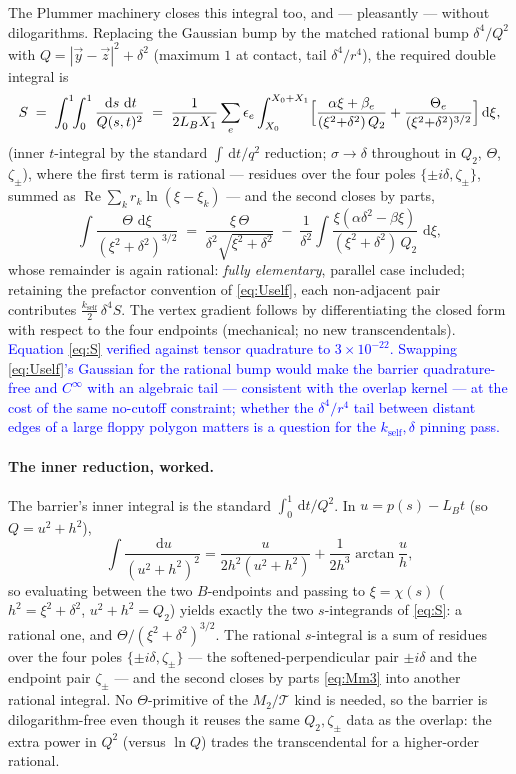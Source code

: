 \documentclass[11pt]{article}
\newcommand{\aside}[1]{\textcolor{blue}{#1}}
\newcommand{\atan}{\operatorname{arctan}}
\newcommand{\dd}{\,\mathrm{d}}
\begin{document}
The Plummer machinery closes this integral too, and --- pleasantly --- without
dilogarithms.  Replacing the Gaussian bump by the matched rational bump
$\delta^4/Q^2$ with $Q=|\vec y-\vec z|^2+\delta^2$ (maximum $1$ at contact, tail
$\delta^4/r^4$), the required double integral is
\begin{equation}
  S \;=\; \int_0^1\!\!\int_0^1 \frac{\dd s\,\dd t}{Q(s,t)^2}
  \;=\; \frac{1}{2L_B X_1}\sum_e \epsilon_e \int_{X_0}^{X_0+X_1}
        \Bigl[\frac{\alpha\xi+\beta_e}{(\xi^2{+}\delta^2)\,Q_2}
        +\frac{\Theta_e}{(\xi^2{+}\delta^2)^{3/2}}\Bigr]\dd\xi ,
  \label{eq:S}
\end{equation}
(inner $t$-integral by the standard $\int\!\dd t/q^2$ reduction; $\sigma\to\delta$
throughout in $Q_2$, $\Theta$, $\zeta_\pm$), where the first
term is rational --- residues over the four poles $\{\pm i\delta,\zeta_\pm\}$, summed
as $\operatorname{Re}\sum_k r_k\ln(\xi-\xi_k)$ --- and the second closes by parts,
\begin{equation}
  \int\!\frac{\Theta\,\dd\xi}{(\xi^2{+}\delta^2)^{3/2}}
  \;=\; \frac{\xi\,\Theta}{\delta^2\sqrt{\xi^2+\delta^2}}
  \;-\;\frac{1}{\delta^2}\int\!\frac{\xi(\alpha\delta^2-\beta\xi)}
       {(\xi^2{+}\delta^2)\,Q_2}\,\dd\xi ,
  \label{eq:Mm3}
\end{equation}
whose remainder is again rational: \emph{fully elementary}, parallel case included;
retaining the prefactor convention of \eqref{eq:Uself}, each non-adjacent pair
contributes $\tfrac{k_{\text{self}}}{2}\,\delta^4 S$.
The vertex gradient follows by differentiating the closed form with respect to the
four endpoints (mechanical; no new transcendentals).  \aside{Equation \eqref{eq:S}
verified against tensor quadrature to $3\times10^{-22}$.  Swapping
\eqref{eq:Uself}'s Gaussian for the rational bump would make the barrier
quadrature-free and $C^\infty$ with an algebraic tail --- consistent with the
overlap kernel --- at the cost of the same no-cutoff constraint; whether the
$\delta^4/r^4$ tail between distant edges of a large floppy polygon matters is a
question for the $k_{\text{self}},\delta$ pinning pass.}

\paragraph{The inner reduction, worked.}  The barrier's inner integral is the standard
$\int_0^1\dd t/Q^2$.  In $u=p(s)-L_Bt$ (so $Q=u^2+h^2$),
\[
  \int\frac{\dd u}{(u^2+h^2)^2}
  = \frac{u}{2h^2(u^2+h^2)}+\frac{1}{2h^3}\atan\frac uh ,
\]
so evaluating between the two $B$-endpoints and passing to $\xi=\chi(s)$
($h^2=\xi^2+\delta^2$, $u^2+h^2=Q_2$) yields exactly the two $s$-integrands of
\eqref{eq:S}: a rational one, and $\Theta/(\xi^2+\delta^2)^{3/2}$.  The rational
$s$-integral is a sum of residues over the four poles $\{\pm i\delta,\zeta_\pm\}$ ---
the softened-perpendicular pair $\pm i\delta$ and the endpoint pair $\zeta_\pm$ --- and
the second closes by parts \eqref{eq:Mm3} into another rational integral.  No
$\Theta$-primitive of the $M_2/\mathcal T$ kind is needed, so the barrier is
dilogarithm-free even though it reuses the same $Q_2,\zeta_\pm$ data as the overlap:
the extra power in $Q^2$ (versus $\ln Q$) trades the transcendental for a
higher-order rational.
\end{document}
